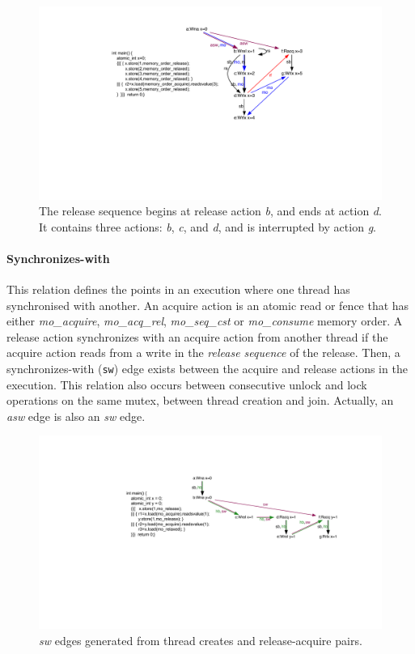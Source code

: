 \documentclass[preprint, numbers, 10pt]{sigplanconf}
\begin{document}
\begin{figure}%
\centering\includegraphics[scale=0.45]{rs_Relation.pdf} %
\caption{The release sequence begins at release action \textit{b}, and
ends at action \textit{d}. It contains three actions: 
\textit{b}, \textit{c}, and \textit{d}, and is interrupted by action \textit{g}.}
\label{fig:rs_relation}
\end{figure}

\paragraph{Synchronizes-with}

This relation defines the points in an execution where
one thread has synchronised with another. 
An acquire action is an atomic read or fence that has 
either \textit{mo\_acquire}, \textit{mo\_acq\_rel}, \textit{mo\_seq\_cst} 
or \textit{mo\_consume} memory order. A release action synchronizes 
with an acquire action from another thread if the acquire action 
reads from a write in the \textit{release sequence} of the release. Then, 
a synchronizes-with (\texttt{sw}) edge exists between the acquire and 
release actions in the execution. 
This relation also occurs between consecutive unlock and lock 
operations on the same mutex, between thread creation and join.
Actually, an \textit{asw} edge is also an \textit{sw} edge.

\begin{figure}%
\centering\includegraphics[scale=0.4]{sw_Relation.pdf} %
\caption{\textit{sw} edges generated from thread creates and 
release-acquire pairs. }
\label{fig:sw_relation}
\end{figure}
\end{document}
